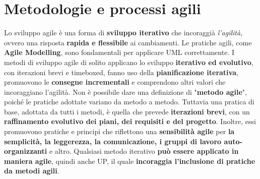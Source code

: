 \documentclass[12pt]{article}
\begin{document}
\section{Metodologie e processi agili}
Lo sviluppo agile è una forma di \textbf{sviluppo iterativo} che incoraggià \textit{l'agilità}, ovvero una risposta \textbf{rapida e flessibile} ai cambiamenti.
Le pratiche agili, come \textbf{Agile Modelling}, sono fondamentali per applicare UML correttamente.
I metodi di sviluppo agile di solito applicano lo sviluppo \textbf{iterativo ed evolutivo}, con iterazioni brevi e timeboxed, fanno uso della \textbf{pianificazione iterativa}, promuovono le \textbf{consegne incrementali} e comprendono altri valori che incoraggiano l'agilità.
Non è possibile dare una definizione di "\textbf{metodo agile}", poiché le pratiche adottate variano da metodo a metodo. Tuttavia una pratica di base, adottata da tutti i metodi, è quella che prevede \textbf{iterazioni brevi}, con un \textbf{raffinamento evolutivo dei piani, dei requisiti e del progetto}.
Inoltre, essi promuovono pratiche e principi che riflettono una \textbf{sensibilità agile} per \textbf{la semplicità, la leggerezza, la comunicazione, i gruppi di lavoro auto-organizzanti} e altro.
Qualsiasi metodo iterativo \textbf{può essere applicato in maniera agile}, quindi anche UP, il quale \textbf{incoraggia l'inclusione di pratiche da metodi agili}.
\end{document}
